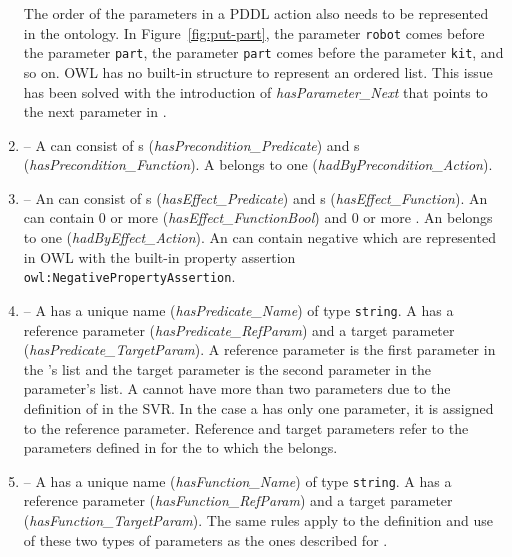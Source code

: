 \begin{enumerate}
    The order of the parameters in a PDDL action also needs to be represented 
in the ontology. In Figure~\ref{fig:put-part}, the parameter \texttt{robot} 
comes before the parameter \texttt{part}, the parameter \texttt{part} comes 
before the parameter \texttt{kit}, and so on. OWL has no built-in structure 
to represent an ordered list. This issue has been solved with the introduction 
of \emph{hasParameter\_Next} that points to the next parameter in .
\item {} -- A  can consist of s 
(\emph{hasPrecondition\_Predicate}) and s (\emph{hasPrecondition\_Function}). 
A  belongs to one  
(\emph{hadByPrecondition\_Action}).
\item {} -- An  can consist of s 
(\emph{hasEffect\_Predicate}) and s (\emph{hasEffect\_Function}). 
An  can contain 0 or more  (\emph{hasEffect\_FunctionBool}) 
and 0 or more . An  belongs to one  
(\emph{hadByEffect\_Action}). An  can contain negative  
which are represented in OWL with the built-in property assertion \texttt{owl:NegativePropertyAssertion}.
\item {} -- A  has a unique name (\emph{hasPredicate\_Name}) 
of type \texttt{string}. A  has a reference parameter 
(\emph{hasPredicate\_RefParam}) and a target parameter (\emph{hasPredicate\_TargetParam}). 
A reference parameter is the first parameter in the 's list and the target 
parameter is the second parameter in the parameter's list. A  cannot have 
more than two parameters due to the definition of  in the SVR. In the 
case a  has only one parameter, it is assigned to the reference parameter. 
Reference and target parameters refer to the parameters defined in  
for the  to which the  belongs.
\item {} -- A  has a unique name (\emph{hasFunction\_Name}) 
of type \texttt{string}. A  has a reference parameter (\emph{hasFunction\_RefParam}) 
and a target parameter (\emph{hasFunction\_TargetParam}). The same rules apply to the 
definition and use of these two types of parameters as the ones described for .

\end{enumerate}
